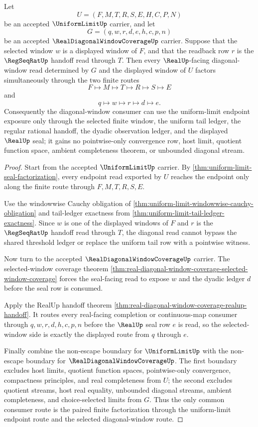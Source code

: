 \begin{theorem}
\label{thm:uniform-limit-diagonal-window-handoff}
Let
$$
U=(F,M,T,R,S,E,H,C,P,N)
$$
be an accepted $\UniformLimitUp$ carrier, and let
$$
G=(q,w,r,d,e,h,c,p,n)
$$
be an accepted $\RealDiagonalWindowCoverageUp$ carrier. Suppose that the selected window $w$ is a displayed window of $F$, and that the readback row $r$ is the $\RegSeqRatUp$ handoff read through $T$. Then every $\RealUp$-facing diagonal-window read determined by $G$ and the displayed window of $U$ factors simultaneously through the two finite routes
$$
F \longmapsto M \longmapsto T \longmapsto R \longmapsto S \longmapsto E
$$
and
$$
q \longmapsto w \longmapsto r \longmapsto d \longmapsto e.
$$
Consequently the diagonal-window consumer can use the uniform-limit endpoint exposure only through the selected finite window, the uniform tail ledger, the regular rational handoff, the dyadic observation ledger, and the displayed $\RealUp$ seal; it gains no pointwise-only convergence row, host limit, quotient function space, ambient completeness theorem, or unbounded diagonal stream.
\end{theorem}
\begin{proof}
Start from the accepted $\UniformLimitUp$ carrier. By \autoref{thm:uniform-limit-seal-factorization}, every endpoint read exported by $U$ reaches the endpoint only along the finite route through $F,M,T,R,S,E$.

Use the windowwise Cauchy obligation of \autoref{thm:uniform-limit-windowwise-cauchy-obligation} and tail-ledger exactness from \autoref{thm:uniform-limit-tail-ledger-exactness}. Since $w$ is one of the displayed windows of $F$ and $r$ is the $\RegSeqRatUp$ handoff read through $T$, the diagonal read cannot bypass the shared threshold ledger or replace the uniform tail row with a pointwise witness.

Now turn to the accepted $\RealDiagonalWindowCoverageUp$ carrier. The selected-window coverage theorem \autoref{thm:real-diagonal-window-coverage-selected-window-coverage} forces the seal-facing read to expose $w$ and the dyadic ledger $d$ before the seal row is consumed.

Apply the RealUp handoff theorem \autoref{thm:real-diagonal-window-coverage-realup-handoff}. It routes every real-facing completion or continuous-map consumer through $q,w,r,d,h,c,p,n$ before the $\RealUp$ seal row $e$ is read, so the selected-window side is exactly the displayed route from $q$ through $e$.

Finally combine the non-escape boundary for $\UniformLimitUp$ with the non-escape boundary for $\RealDiagonalWindowCoverageUp$. The first boundary excludes host limits, quotient function spaces, pointwise-only convergence, compactness principles, and real completeness from $U$; the second excludes quotient streams, host real equality, unbounded diagonal streams, ambient completeness, and choice-selected limits from $G$. Thus the only common consumer route is the paired finite factorization through the uniform-limit endpoint route and the selected diagonal-window route.
\end{proof}

